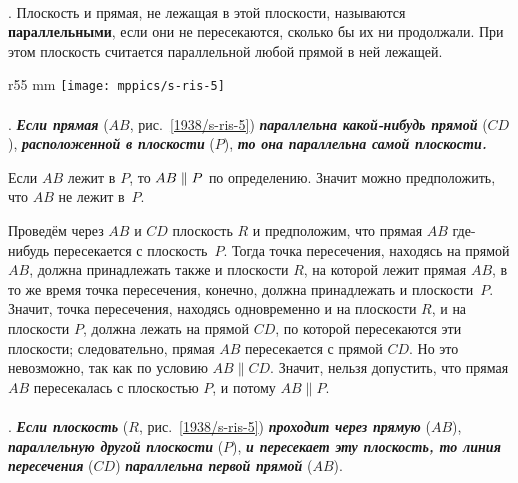 \paragraph{}\label{1938/s9}
. Плоскость и прямая, не лежащая в этой плоскости, называются \textbf{параллельными}, если они не пересекаются, сколько бы их ни продолжали.
При этом плоскость считается параллельной любой прямой в ней лежащей.

\begin{wrapfigure}{r}{55 mm}
\centering
\texttt{[image: mppics/s-ris-5]}
\caption{}\label{1938/s-ris-5}
\end{wrapfigure}

\paragraph{}\label{1938/s10}
\mbox{.} \textbf{\emph{Если прямая}} ($AB$, рис.~\ref{1938/s-ris-5}) \textbf{\emph{параллельна какой-нибудь прямой}} ($CD$), \textbf{\emph{расположенной в плоскости}} ($P$), \textbf{\emph{то она параллельна самой плоскости.}}

Если $AB$ лежит в $P$, то $AB\z\parallel P$ по определению.
Значит можно предположить, что $AB$ не лежит в~$P$.

Проведём через $AB$ и $CD$ плоскость $R$ и предположим, что прямая $AB$ где-нибудь пересекается с плоскость~$P$.
Тогда точка пересечения, находясь на прямой $AB$, должна принадлежать также и плоскости $R$, на которой лежит прямая $AB$, в то же время точка пересечения, конечно, должна принадлежать и плоскости~$P$.
Значит, точка пересечения, находясь одновременно и на плоскости $R$, и на плоскости $P$, должна лежать на прямой $CD$, по которой пересекаются эти плоскости;
следовательно, прямая $AB$ пересекается с прямой $CD$.
Но это невозможно, так как по условию $AB\parallel CD$.
Значит, нельзя допустить, что прямая $AB$ пересекалась с плоскостью $P$, и потому $AB\parallel P$.

\paragraph{}\label{1938/s11}
. \textbf{\emph{Если плоскость}} ($R$, рис.~\ref{1938/s-ris-5}) \textbf{\emph{проходит через прямую}} ($AB$), \textbf{\emph{параллельную другой плоскости}} ($P$), \textbf{\emph{и пересекает эту плоскость, то линия пересечения}} ($CD$) \textbf{\emph{параллельна первой прямой}} ($AB$).

